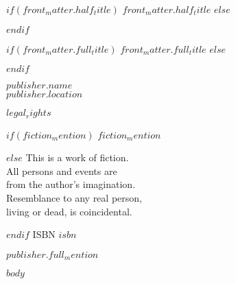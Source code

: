 \documentclass[$for(class_options)$$class_options$$sep$,$endfor$]{novel} %
\begin{document}
\frontmatter

\thispagestyle{empty}
$if(front_matter.half_title)$
$front_matter.half_title$
$else$
\vspace*{6\nbs}
\hfill\charscale[2.4]{\textbf{\theTitle}}\par
$endif$
\clearpage

\thispagestyle{empty}
\null
\clearpage

\thispagestyle{empty}
\vspace*{5\nbs}
\begin{center}
$if(front_matter.full_title)$
$front_matter.full_title$
$else$
\charscale[3.6]{\textbf{\theTitle}}\par
$endif$
\vspace{1.5\nbs}
\charscale[1.6]{\theSubtitle}\par
\vspace{4\nbs}
\vspace{4\nbs}
{\theAuthor}
\vfill
{ $publisher.name$\\
$publisher.location$}\par

\end{center}
\clearpage


\thispagestyle{empty}
\begin{center}
\itshape{
\null
\vfill
\textsc{\theTitle}\par
\par

$legal_rights$\par
\null
$if(fiction_mention)$
$fiction_mention$\par
$else$
This is a work of fiction.\\
All persons and events are\\
from the author's imagination.\\
Resemblance to any real person,\\
living or dead, is coincidental.\par
$endif$
\null
ISBN $isbn$\par %
\null

$publisher.full_mention$
} %
\end{center}
\clearpage

$body$
\end{document}
